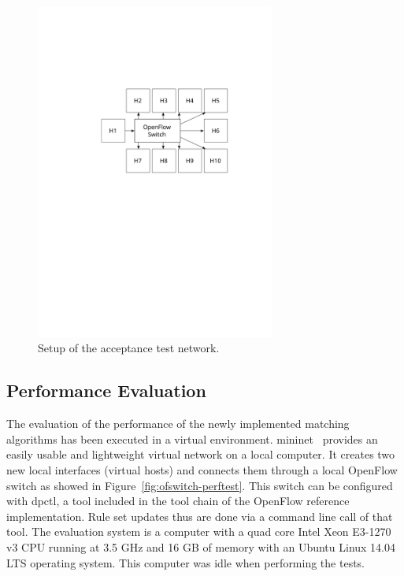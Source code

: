\documentclass[a4paper,
		12pt,
		parskip=full,
		titlepage
		]{scrartcl}
\begin{document}
\begin{figure}
\centering
\includegraphics[width=0.7\textwidth]{images/ofswitch-acctest}
\caption{Setup of the acceptance test network.}
\label{fig:ofswitch-acctest}
\end{figure}

\subsection{Performance Evaluation}
The evaluation of the performance of the newly implemented matching algorithms has been executed in a virtual environment.
\textsf{mininet}~\cite{mininet} provides an easily usable and lightweight virtual network on a local computer.
It creates two new local interfaces (virtual hosts) and connects them through 
a local OpenFlow switch as showed in Figure~\ref{fig:ofswitch-perftest}.
This switch can be configured with \textsf{dpctl}, a tool included in the tool chain of the OpenFlow reference implementation.
Rule set updates thus are done via a command line call of that tool.
The evaluation system is a computer with a quad core Intel Xeon E3-1270 v3 CPU 
running at 3.5 GHz and 16 GB of memory with an Ubuntu Linux 14.04 LTS operating system.
This computer was idle when performing the tests.
\end{document}

